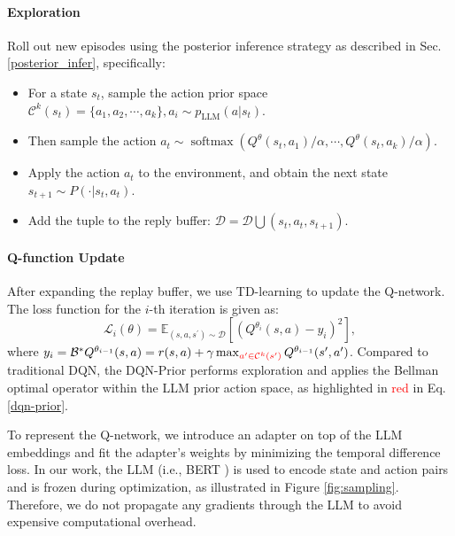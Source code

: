 \documentclass{article} %
\theoremstyle{plain}
\theoremstyle{definition}
\theoremstyle{remark}
\newcommand{\fig}{{Figure }}
\newcommand{\eq}{{Eq. }}
\begin{document}
{\paragraph{Exploration} 
Roll out new episodes using the posterior inference strategy as described in Sec. \ref{posterior_infer}, specifically:
\begin{itemize}
    \item For a state $s_t$, sample the action prior space $\mathcal{C}^k(s_t)=\{a_1,a_2,\cdots,a_k\}, a_i \sim p_\text{LLM}(a|s_t)$. 
    \item Then sample the action $a_t\sim \operatorname{softmax}\left({Q^\theta(s_t,a_1)/\alpha},\cdots,{Q^\theta(s_t,a_k)/\alpha}\right)$. 
    \item Apply the action $a_t$ to the environment, and obtain the next state $s_{t+1}\sim P(\cdot|s_t,a_t)$. 
    \item Add the tuple to the reply buffer: $\mathcal{D}=\mathcal{D}\bigcup (s_t,a_t,s_{t+1})$. 
\end{itemize}
\paragraph{Q-function Update} After expanding the replay buffer, we use TD-learning to update the Q-network. The loss function for the $i$-th iteration is given as:
\begin{equation}
\label{dqn-prior}
\mathcal{L}_i(\theta)=\mathbb{E}_{(s,a,s^\prime)\sim \mathcal{D}}\left[(Q^{\theta_i}(s,a)-y_i)^2\right],
\end{equation}
where $y_i=\mathcal{B}^*Q^{\theta_{i-1}}(s,a)=r(s,a)+\gamma \max_{\textcolor{red}{a^\prime\in \mathcal{C}^k(s^\prime)}} Q^{\theta_{i-1}}(s^\prime,a^\prime)$.
Compared to traditional DQN, the DQN-Prior performs exploration and applies the Bellman optimal operator within the LLM prior action space, as highlighted in \textcolor{red}{red} in \eq \ref{dqn-prior}.

To represent the Q-network, we introduce an adapter on top of the LLM embeddings and fit the adapter's weights by minimizing the temporal difference loss. In our work, the LLM (i.e., BERT \citep{devlin2018bert}) is used to encode state and action pairs and is frozen during optimization, as illustrated in \fig  \ref{fig:sampling}. Therefore, we do not propagate any gradients through the LLM to avoid expensive computational overhead.

}
\end{document}
